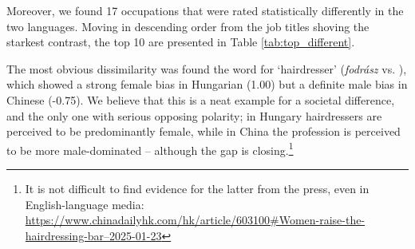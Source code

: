 \documentclass[11pt]{article}
\newcommand{\zh}[1]{\simplifiedchinesefont{#1}\rmfamily}
\begin{document}


Moreover, we found 17 occupations that were rated statistically differently in the two languages. Moving in descending order from the job titles shoving the starkest contrast, the top 10 are presented in Table \ref{tab:top_different}.

The most obvious dissimilarity was found the word for `hairdresser' (\textit{fodrász} vs. \zh{理发师}), which showed a strong female bias in Hungarian (1.00) but a definite male bias in Chinese (-0.75). We believe that this is a neat example for a societal difference, and the only one with serious opposing polarity; in Hungary hairdressers are perceived to be predominantly female, while in China the profession is perceived to be more male-dominated -- although the gap is closing.\footnote{It is not difficult to find evidence for the latter from the press, even in English-language media: \href{https://www.chinadailyhk.com/hk/article/603100\#Women-raise-the-hairdressing-bar--2025-01-23}{https://www.chinadailyhk.com/hk/article/603100\#Women-raise-the-hairdressing-bar--2025-01-23}}
\end{document}
